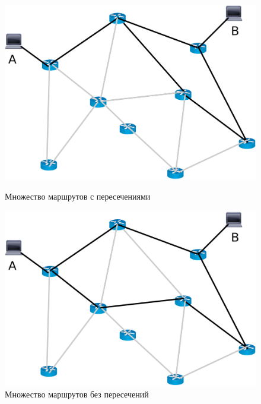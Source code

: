\documentclass[a4paper]{article}
\begin{document}
\begin{figure}[!htb]
   \begin{minipage}{0.5\textwidth}
     \centering
     \includegraphics[width=.9\linewidth]{isect.png}
     \caption{Множество маршрутов с пересечениями}\label{Fig:Data3}
   \end{minipage}
   \begin{minipage}{0.5\textwidth}
     \centering
     \includegraphics[width=.9\linewidth]{noisect.png}
     \caption{Множество маршрутов без пересечений}\label{Fig:Data4}
   \end{minipage}\hfill
\end{figure}
\end{document}
